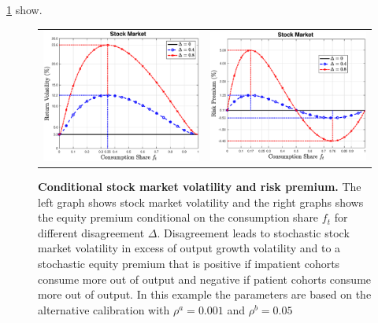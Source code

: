 \ref{fig:VolaRiskPremium2f} show.
\begin{figure}[H]
\centering
\vspace{0.1in}
\begin{tabular}{cc}
\includegraphics[width=.45\textwidth]{figures/StockMarketVola2f.eps} &
\includegraphics[width=.45\textwidth]{figures/StockMarketRiskPremium2f.eps}
\end{tabular}
\caption{\textbf{Conditional stock market volatility and risk premium.} \footnotesize{The left graph shows stock market volatility and the right graphs shows the equity premium conditional on the consumption share $f_t$ for different disagreement $\Delta$. Disagreement leads to stochastic stock market volatility in excess of output growth volatility and to a stochastic equity premium that is positive if impatient cohorts consume more out of output and negative if patient cohorts consume more out of output. In this example the parameters are based on the alternative calibration with $\rho^a = 0.001$ and $\rho^b = 0.05$}} \label{fig:VolaRiskPremium2f} 
 \end{figure}
